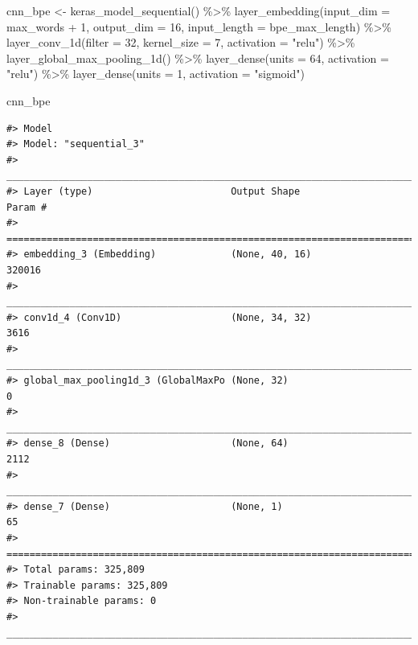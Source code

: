 \documentclass[
]{krantz}
\makeatletter
\newenvironment{Shaded}{\begin{snugshade}}{\end{snugshade}}
\newcommand{\AttributeTok}[1]{\textcolor[rgb]{0.77,0.63,0.00}{#1}}
\newcommand{\DecValTok}[1]{\textcolor[rgb]{0.00,0.00,0.81}{#1}}
\newcommand{\FunctionTok}[1]{\textcolor[rgb]{0.00,0.00,0.00}{#1}}
\newcommand{\NormalTok}[1]{#1}
\newcommand{\OtherTok}[1]{\textcolor[rgb]{0.56,0.35,0.01}{#1}}
\newcommand{\SpecialCharTok}[1]{\textcolor[rgb]{0.00,0.00,0.00}{#1}}
\newcommand{\StringTok}[1]{\textcolor[rgb]{0.31,0.60,0.02}{#1}}
\newenvironment{kframe}{%
\medskip{}
\setlength{\fboxsep}{.8em}
 \def\at@end@of@kframe{}%
 \ifinner\ifhmode%
  \def\at@end@of@kframe{\end{minipage}}%
  \begin{minipage}{\columnwidth}%
 \fi\fi%
 \def\FrameCommand##1{\hskip\@totalleftmargin \hskip-\fboxsep
 \colorbox{shadecolor}{##1}\hskip-\fboxsep
     \hskip-\linewidth \hskip-\@totalleftmargin \hskip\columnwidth}%
 \MakeFramed {\advance\hsize-\width
   \@totalleftmargin\z@ \linewidth\hsize
   \@setminipage}}%
 {\par\unskip\endMakeFramed%
 \at@end@of@kframe}
\renewenvironment{Shaded}{\begin{kframe}}{\end{kframe}}
\makeatother
\begin{document}
\begin{Shaded}
\begin{Highlighting}[]
\NormalTok{cnn\_bpe }\OtherTok{\textless{}{-}} \FunctionTok{keras\_model\_sequential}\NormalTok{() }\SpecialCharTok{\%\textgreater{}\%}
  \FunctionTok{layer\_embedding}\NormalTok{(}\AttributeTok{input\_dim =}\NormalTok{ max\_words }\SpecialCharTok{+} \DecValTok{1}\NormalTok{, }\AttributeTok{output\_dim =} \DecValTok{16}\NormalTok{,}
                  \AttributeTok{input\_length =}\NormalTok{ bpe\_max\_length) }\SpecialCharTok{\%\textgreater{}\%}
  \FunctionTok{layer\_conv\_1d}\NormalTok{(}\AttributeTok{filter =} \DecValTok{32}\NormalTok{, }\AttributeTok{kernel\_size =} \DecValTok{7}\NormalTok{, }\AttributeTok{activation =} \StringTok{"relu"}\NormalTok{) }\SpecialCharTok{\%\textgreater{}\%}
  \FunctionTok{layer\_global\_max\_pooling\_1d}\NormalTok{() }\SpecialCharTok{\%\textgreater{}\%}
  \FunctionTok{layer\_dense}\NormalTok{(}\AttributeTok{units =} \DecValTok{64}\NormalTok{, }\AttributeTok{activation =} \StringTok{"relu"}\NormalTok{) }\SpecialCharTok{\%\textgreater{}\%}
  \FunctionTok{layer\_dense}\NormalTok{(}\AttributeTok{units =} \DecValTok{1}\NormalTok{, }\AttributeTok{activation =} \StringTok{"sigmoid"}\NormalTok{)}

\NormalTok{cnn\_bpe}
\end{Highlighting}
\end{Shaded}

\begin{verbatim}
#> Model
#> Model: "sequential_3"
#> ________________________________________________________________________________
#> Layer (type)                        Output Shape                    Param #     
#> ================================================================================
#> embedding_3 (Embedding)             (None, 40, 16)                  320016      
#> ________________________________________________________________________________
#> conv1d_4 (Conv1D)                   (None, 34, 32)                  3616        
#> ________________________________________________________________________________
#> global_max_pooling1d_3 (GlobalMaxPo (None, 32)                      0           
#> ________________________________________________________________________________
#> dense_8 (Dense)                     (None, 64)                      2112        
#> ________________________________________________________________________________
#> dense_7 (Dense)                     (None, 1)                       65          
#> ================================================================================
#> Total params: 325,809
#> Trainable params: 325,809
#> Non-trainable params: 0
#> ________________________________________________________________________________
\end{verbatim}
\end{document}
